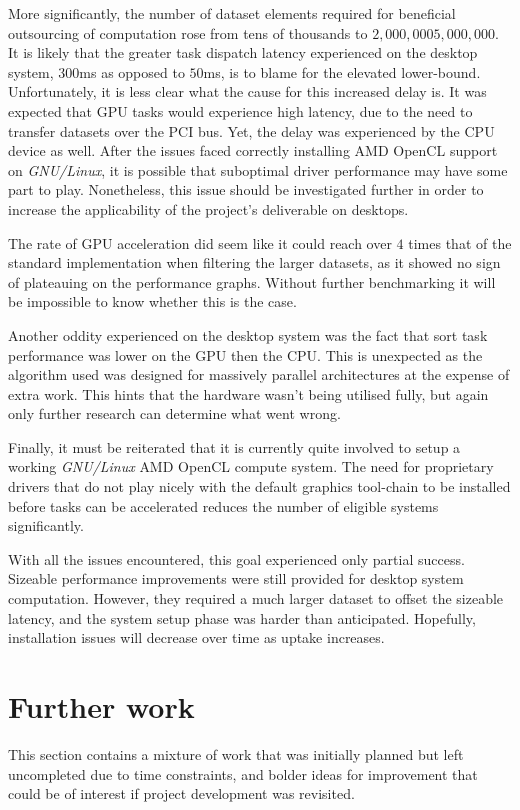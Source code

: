 More significantly, the number of dataset elements required for beneficial outsourcing of computation rose from tens of thousands to $2,000,000$\textendash$5,000,000$. It is likely that the greater task dispatch latency experienced on the desktop system, $300$ms as opposed to $50$ms, is to blame for the elevated lower-bound. Unfortunately, it is less clear what the cause for this increased delay is. It was expected that \ac{GPU} tasks would experience high latency, due to the need to transfer datasets over the \ac{PCI} bus. Yet, the delay was experienced by the \ac{CPU} device as well. After the issues faced correctly installing \ac{AMD} \ac{OpenCL} support on \emph{GNU/Linux}, it is possible that suboptimal driver performance may have some part to play. Nonetheless, this issue should be investigated further in order to increase the applicability of the project's deliverable on desktops.

The rate of \ac{GPU} acceleration did seem like it could reach over $4$ times that of the standard implementation when filtering the larger datasets, as it showed no sign of plateauing on the performance graphs. Without further benchmarking it will be impossible to know whether this is the case.

Another oddity experienced on the desktop system was the fact that sort task performance was lower on the \ac{GPU} then the \ac{CPU}. This is unexpected as the algorithm used was designed for massively parallel architectures at the expense of extra work. This hints that the hardware wasn't being utilised fully, but again only further research can determine what went wrong.

Finally, it must be reiterated that it is currently quite involved to setup a working \emph{GNU/Linux} \ac{AMD} \ac{OpenCL} compute system. The need for proprietary drivers that do not play nicely with the default graphics tool-chain to be installed before tasks can be accelerated reduces the number of eligible systems significantly.

With all the issues encountered, this goal experienced only partial success. Sizeable performance improvements were still provided for desktop system computation. However, they required a much larger dataset to offset the sizeable latency, and the system setup phase was harder than anticipated. Hopefully, installation issues will decrease over time as uptake increases.

\section{Further work}
This section contains a mixture of work that was initially planned but left uncompleted due to time constraints, and bolder ideas for improvement that could be of interest if project development was revisited.

